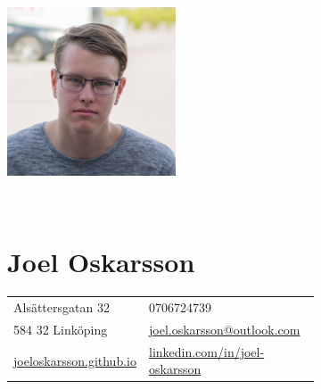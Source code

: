 \documentclass[12pt]{article}
\newcommand{\text}[2]{#2}
\newcommand{\text}[2]{#1}
\begin{document}
\begin{figure}
    \begin{subfigure}[]{0.4\textwidth}
        \includegraphics[height=5cm]{photo}
    \end{subfigure}%
    ~
    \begin{subfigure}[]{0.5\textwidth}
        \part*{Joel Oskarsson}

        \begin{tabular}{l l}
            Alsättersgatan 32 & \text{+46706724739}{0706724739}\\
            584 32 Linköping & \href{mailto:joel.oskarsson@outlook.com}{joel.oskarsson@outlook.com}\\
            \href{http://joeloskarsson.github.io}{joeloskarsson.github.io} & \href{http://linkedin.com/in/joel-oskarsson}{linkedin.com/in/joel-oskarsson}
        \end{tabular}

     \end{subfigure}%
\end{figure}
\end{document}
